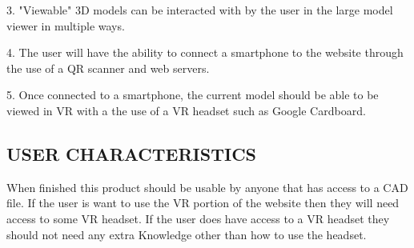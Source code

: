 \documentclass[letterpaper, 10pt, draftclsnofoot, onecolumn]{IEEEtran}
\begin{document}
{{3.	"Viewable" 3D models can be interacted with by the user in the large model viewer in multiple ways.

4.	The user will have the ability to connect a smartphone to the website through the use of a QR scanner
	and web servers. 

5.	Once connected to a smartphone, the current model should be able to be viewed in VR with a the use
	of a VR headset such as Google Cardboard. 
}

\subsection[USER
CHARACTERISTICS]{\rmfamily\bfseries\color{black}
USER CHARACTERISTICS}
\begin{comment}

{\selectlanguage{english}\itshape\color{black}
This subsection of the document should describe those general
characteristics of the intended users of the product including
educational level, experience, and technical expertise. \ It should not
be used to state specific requirements, but rather should provide
the reasons why certain specific requirements are later
specied in Section 3 of this document.}
\end{comment}
{\color{black}
When finished this product should be usable by anyone that has access to a CAD file. If the user is want to use the VR portion of the website then they will need access to some VR headset. If the user does have access to a VR headset they should not need any extra Knowledge other than how to use the headset.  }
\begin{comment}

\subsection[CONSTRAINTS]{\selectlanguage{english}\rmfamily\bfseries\color{black}
CONSTRAINTS}
{\selectlanguage{english}\itshape\color{black}
This subsection of the document should provide a general description of
any other items that will limit the developer{\textquoteright}s
options. \ These include: a) Regulatory policies; b) Hardware
limitations (e.g., signal timing requirements); c) Interfaces to other
applications; d) Parallel operation; e) Audit functions; f) Control
functions; g) Higher-order language requirements; h) Signal handshake
protocols; i) Reliability requirements; j) Criticality of the
application; k) Safety and security considerations.}


\end{comment}}
\end{document}
